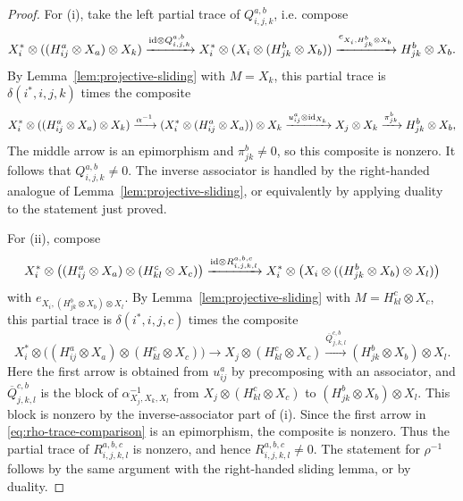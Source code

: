 \documentclass[12pt]{amsart}
\numberwithin{equation}{section}
\theoremstyle{definition}
\newcommand{\1}{_{(1)}}
\newcommand{\2}{_{(2)}}
\newcommand{\3}{_{(3)}}
\newcommand{\4}{_{(4)}}
\newcommand{\5}{_{(5)}}
\newcommand{\6}{_{(6)}}
\theoremstyle{plain}
\theoremstyle{definition}
\theoremstyle{remark}
\begin{document}
\begin{proof}
For (i), take the left partial trace of \(Q^{a,b}_{i,j,k}\), i.e. compose
\[
        X_i^*\otimes((H^a_{ij}\otimes X_a)\otimes X_k)
        \xrightarrow{{\rm id}\otimes Q^{a,b}_{i,j,k}}
        X_i^*\otimes(X_i\otimes(H^b_{jk}\otimes X_b))
        \xrightarrow{e_{X_i,H^b_{jk}\otimes X_b}}
        H^b_{jk}\otimes X_b .
\]
By Lemma~\ref{lem:projective-sliding} with
 \(M=X_k\), this partial trace is
\(\delta(i^*,i,j,k)\) times the composite \scriptsize
\begin{equation*} 
        X_i^*\otimes((H^a_{ij}\otimes X_a)\otimes X_k)
        \xrightarrow{\alpha^{-1}}
        (X_i^*\otimes(H^a_{ij}\otimes X_a))\otimes X_k
        \xrightarrow{u^a_{ij}\otimes{\rm id}_{X_k}}
        X_j\otimes X_k
        \xrightarrow{\pi^b_{jk}}
        H^b_{jk}\otimes X_b ,
\end{equation*} \normalsize
The middle arrow is
an epimorphism and \(\pi^b_{jk}\ne 0\), so this composite is nonzero. It follows that 
\(Q^{a,b}_{i,j,k}\ne 0\).  The inverse associator is handled by the
right-handed analogue of Lemma~\ref{lem:projective-sliding}, or equivalently
by applying duality to the statement just proved.

For (ii), compose
\begin{equation*}
        X_i^*\otimes\bigl((H^a_{ij}\otimes X_a)
        \otimes(H^c_{kl}\otimes X_c)\bigr)
        \xrightarrow{{\rm id}\otimes R_{i,j,k,l}^{a,b,c}}
        X_i^*\otimes\bigl(X_i\otimes((H^b_{jk}\otimes X_b)\otimes X_l)\bigr)
\end{equation*}
with \(e_{X_i,(H^b_{jk}\otimes X_b)\otimes X_l}\).
By Lemma~\ref{lem:projective-sliding} with
\(M=H^c_{kl}\otimes X_c\), this partial trace is
\(\delta(i^*,i,j,c)\) times the composite \scriptsize
\begin{equation}
\label{eq:rho-trace-comparison}
        X_i^*\otimes\bigl((H^a_{ij}\otimes X_a)
        \otimes(H^c_{kl}\otimes X_c)\bigr)
        \longrightarrow
        X_j\otimes(H^c_{kl}\otimes X_c)
        \xrightarrow{\overline Q^{c,b}_{j,k,l}}
        (H^b_{jk}\otimes X_b)\otimes X_l .
\end{equation} \normalsize
Here the first arrow is obtained from \(u^a_{ij}\) by precomposing with an 
associator, and \(\overline Q^{c,b}_{j,k,l}\) is the block
of \(\alpha^{-1}_{X_j,X_k,X_l}\) from
\(X_j\otimes(H^c_{kl}\otimes X_c)\) to
\((H^b_{jk}\otimes X_b)\otimes X_l\).  This block is nonzero by the
inverse-associator part of (i).  Since the first arrow in
\eqref{eq:rho-trace-comparison} is an epimorphism, the composite is nonzero.
Thus the partial trace of \(R_{i,j,k,l}^{a,b,c}\) is nonzero, and hence
\(R_{i,j,k,l}^{a,b,c}\ne 0\).  The statement for \(\rho^{-1}\) follows by the same
argument with the right-handed sliding lemma, or by duality.


\end{proof}
\end{document}
